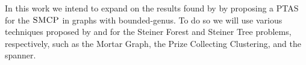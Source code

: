 


In this work we intend to expand on the results found by \cite{LINTZMAYER2020134} by proposing a PTAS for the \(\textsc{SMCP}\) in graphs with bounded-genus. To do so we will use various techniques proposed by \cite{Bateni} and \cite{Borradaile2009b} for the Steiner Forest and Steiner Tree problems, respectively, such as the Mortar Graph, the Prize Collecting Clustering, and the spanner.

